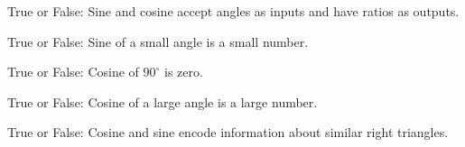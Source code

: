 \documentclass[noauthor,nooutcomes]{ximera}
\author{Bart Snapp}
\begin{document}
\maketitle


\begin{exercise}
True or False: Sine and cosine accept angles as inputs and have ratios
as outputs.
\end{exercise}

\begin{exercise}
True or False: Sine of a small angle is a small number.
\end{exercise}


\begin{exercise}
True or False: Cosine of $90^\circ$ is zero.
\end{exercise}

\begin{exercise}
True or False: Cosine of a large angle is a large number.
\end{exercise}

\begin{exercise}
True or False: Cosine and sine encode information about similar right triangles.
\end{exercise}



\end{document}
